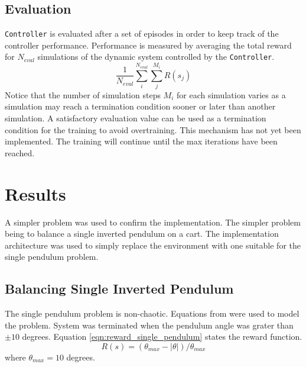 \documentclass{LTHtwocol} %
\begin{document}
\subsection{Evaluation}
\texttt{Controller} is evaluated after a set of episodes in order to keep track of the controller performance.
Performance is measured by averaging the total reward for $N_{eval}$ simulations of the dynamic system controlled by the \texttt{Controller}.
\begin{equation}
	\label{eqn:evaluation_equation}
	\frac{1}{N_{eval}} \sum_i^{N_{eval}} \sum_j^{M_i} R(s_j)
\end{equation}
Notice that the number of simulation steps $M_i$ for each simulation varies as a simulation may reach a termination condition sooner or later than another simulation.
A satisfactory evaluation value can be used as a termination condition for the training to avoid overtraining.
This mechanism has not yet been implemented.
The training will continue until the max iterations have been reached.



\section{Results}
A simpler problem was used to confirm the implementation.
The simpler problem being to balance a single inverted pendulum on a cart.
The implementation architecture was used to simply replace the environment with one suitable for the single pendulum problem.

\subsection{Balancing Single Inverted Pendulum}
The single pendulum problem is non-chaotic.
Equations from \cite{Correct_Equations} were used to model the problem.
System was terminated when the pendulum angle was grater than $\pm 10$ degrees.
Equation \eqref{eqn:reward_single_pendulum} states the reward function.
\begin{equation}
    \label{eqn:reward_single_pendulum}
    R(s) = (\theta_{max} - |\theta|)/ \theta_{max}
\end{equation}
where $\theta_{max} = 10$ degrees.
\end{document}
